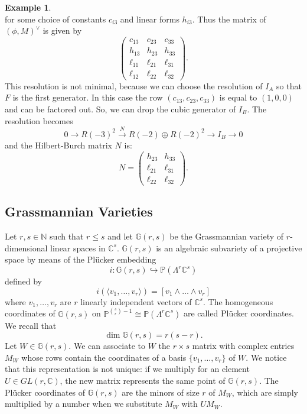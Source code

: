 \documentclass{amsart}
\newcommand{\C}{\mathbb{C}}
\newcommand{\Pj}{\mathbb{P}}
\newcommand{\N}{\mathbb{N}}
\newcommand{\G}{\mathbb{G}}
\theoremstyle{definition}
\newtheorem{exa0}[thm0]{Example}
\begin{document}
\begin{exa0}
$$$$
for some choice of constants $c_{i3}$ and linear forms $h_{i3}$.
Thus the matrix of $(\phi,M)^\vee$ is given by
$$ \begin{pmatrix} c_{13} & c_{23} & c_{33} \\ h_{13} & h_{23} & h_{33} \\ \ell_{11} & \ell_{21} & \ell_{31} \\  \ell_{12} & \ell_{22} & \ell_{32} 
\end{pmatrix}. $$
This resolution is not minimal, because we can choose the resolution of $I_A$ so that $F$ is the first generator. In this case
the row $(c_{13} , c_{23} , c_{33})$ is equal to $(1,0,0)$ and can be factored out. So, we can drop
the cubic generator of $I_B$. The resolution becomes
$$0 \to R(-3)^2 \xrightarrow {N} R(-2)\oplus  R(-2)^2 \longrightarrow  I_B \to 0$$
and the Hilbert-Burch matrix $N$ is:
$$ N= \begin{pmatrix}  h_{23} & h_{33} \\ \ell_{21} &  \ell_{31} \\   \ell_{22} &  \ell_{32} 
\end{pmatrix}. $$
\end{exa0}

\subsection{Grassmannian Varieties}

Let $ r,s \in \N $ such that $ r \leq s $ and let $ \G(r,s) $ be the Grassmannian variety of $r$-dimensional linear  spaces in $ \C^{s} $. $ \G(r,s) $ 
is an algebraic subvariety of a projective space by means of the Pl\"ucker embedding
\begin{equation}\label{eq:Pl}
i : \G(r,s) \hookrightarrow \Pj(\Lambda^{r}\C^{s}) 
\end{equation} 
defined by 
$$ i(\langle v_{1}, \ldots, v_{r} \rangle) = [v_{1} \wedge \ldots \wedge v_{r}]  $$
where $ v_{1}, \ldots, v_{r} $ are $ r $ linearly independent vectors of $ \C^{s} $. The homogeneous coordinates of 
$ \G(r,s) $ on $ \Pj^{\binom{s}{r}-1} \cong \Pj(\Lambda^{r}\C^{s}) $ are called Pl\"ucker coordinates. 
We recall that 
$$ \dim \G(r,s) = r(s-r). $$
Let $ W \in \G(r,s) $. We can associate to $ W $ the $ r \times s $ matrix with complex entries $ M_{W} $ whose rows contain the coordinates of a basis 
$ \{v_{1}, \ldots, v_{r}\} $ of $ W $. We notice that this representation is not unique: if we multiply for an element $U\in GL(r,\C) $, the new matrix represents the same point of $\G(r,s) $.
The Pl\"ucker coordinates of $ \G(r,s) $ are the minors of size $ r $ of $ M_{W} $, which are simply multiplied by a number when we substitute  $ M_{W} $ with $U M_{W} $.  \\
\end{document}
